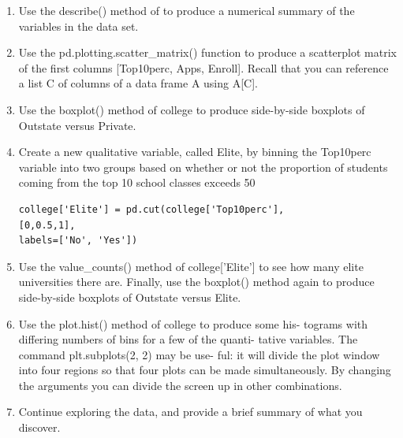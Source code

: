 \begin{exercise}[2.8]
\begin{enumerate}[label=(\alph*)]
		\item Use the describe() method of to produce a numerical summary
		of the variables in the data set.
		\item Use the pd.plotting.scatter\_matrix() function to produce a
		scatterplot matrix of the first columns [Top10perc, Apps, Enroll].
		Recall that you can reference a list C of columns of a data frame
		A using A[C].
		\item Use the boxplot() method of college to produce side-by-side
		boxplots of Outstate versus Private.
		\item Create a new qualitative variable, called Elite, by binning the
		Top10perc variable into two groups based on whether or not the
		proportion of students coming from the top 10%
		school classes exceeds 50%
		\begin{lstlisting}
college['Elite'] = pd.cut(college['Top10perc'],
[0,0.5,1],
labels=['No', 'Yes'])
		\end{lstlisting}
		\item Use the value\_counts() method of college['Elite'] to see how
		many elite universities there are. Finally, use the boxplot() method
		again to produce side-by-side boxplots of Outstate versus Elite.
		\item Use the plot.hist() method of college to produce some his-
		tograms with differing numbers of bins for a few of the quanti-
		tative variables. The command plt.subplots(2, 2) may be use-
		ful: it will divide the plot window into four regions so that four
		plots can be made simultaneously. By changing the arguments
		you can divide the screen up in other combinations.
		\item Continue exploring the data, and provide a brief summary of
		what you discover.		
	\end{enumerate}		
	\end{exercise}

